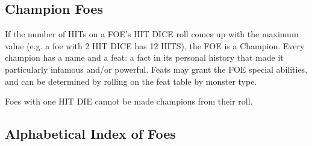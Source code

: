\subsection{Champion Foes}
If the number of HITs on a FOE's HIT DICE roll comes up with the maximum value (e.g. a foe with 2 HIT DICE has 12 HITS), the FOE is a Champion. Every champion has a name and a feat: a fact in its personal history that made it particularly infamous and/or powerful. Feats may grant the FOE special abilities, and can be determined by rolling on the feat table by monster type.

Foes with one HIT DIE cannot be made champions from their roll.

\subsection{Alphabetical Index of Foes}
